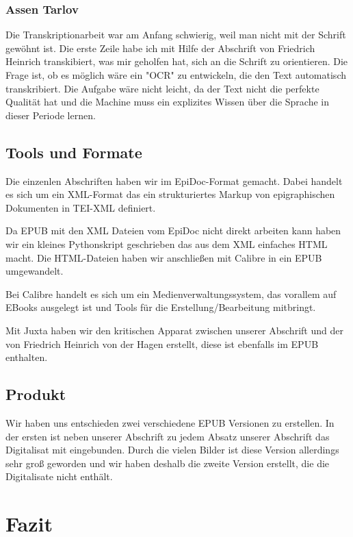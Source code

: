\documentclass[a4paper, 12pt, oneside]{scrbook}
\begin{document}
\subsection{Assen Tarlov}

Die Transkriptionarbeit war am Anfang schwierig, weil man nicht mit der Schrift gewöhnt ist. Die erste Zeile habe ich mit Hilfe der Abschrift von Friedrich Heinrich transkibiert, was mir geholfen hat, sich an die Schrift zu orientieren. Die Frage ist, ob es möglich wäre ein "OCR" zu entwickeln, die den Text automatisch transkribiert. Die Aufgabe wäre nicht leicht, da der Text nicht die perfekte Qualität hat und die Machine muss ein explizites Wissen über die Sprache in dieser Periode lernen.

\section{Tools und Formate}
Die einzenlen Abschriften haben wir im EpiDoc-Format gemacht. Dabei handelt es sich um ein XML-Format das ein strukturiertes Markup von epigraphischen Dokumenten in TEI-XML definiert.

Da EPUB mit den XML Dateien vom EpiDoc nicht direkt arbeiten kann haben wir ein kleines Pythonskript geschrieben das aus dem XML einfaches HTML macht. Die HTML-Dateien haben wir anschließen mit Calibre in ein EPUB umgewandelt.

Bei Calibre\cite{calibre} handelt es sich um ein Medienverwaltungssystem, das vorallem auf EBooks ausgelegt ist und Tools für die Erstellung/Bearbeitung mitbringt.

Mit Juxta\cite{juxta} haben wir den kritischen Apparat zwischen unserer Abschrift und der von  Friedrich Heinrich von der Hagen erstellt, diese ist ebenfalls im EPUB enthalten.
\section{Produkt}
Wir haben uns entschieden zwei verschiedene EPUB Versionen zu erstellen. In der ersten ist neben unserer Abschrift zu jedem Absatz unserer Abschrift das Digitalisat mit eingebunden. Durch die vielen Bilder ist diese Version allerdings sehr groß geworden und wir haben deshalb die zweite Version erstellt, die die Digitalisate nicht enthält.

\chapter{Fazit}
\end{document}
